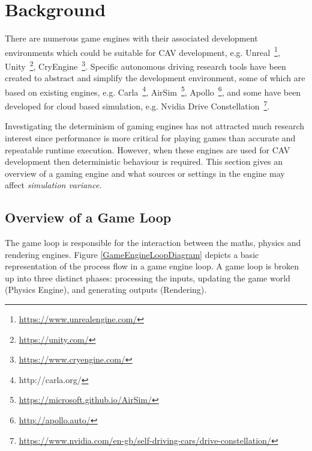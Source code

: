 






\section{Background} \label{s:background}

There are numerous game engines with their associated development environments which could be suitable for CAV development, e.g. Unreal~\footnote{\url{https://www.unrealengine.com/}}, Unity~\footnote{\url{https://unity.com/}}, CryEngine~\footnote{\url{https://www.cryengine.com/}}. Specific autonomous driving research tools have been created to abstract and simplify the development environment, some of which are based on existing engines, e.g. Carla~\footnote{http://carla.org/}, AirSim~\footnote{\url{https://microsoft.github.io/AirSim/}}, Apollo~\footnote{\url{http://apollo.auto/}}, and some have been developed for cloud based simulation, e.g. Nvidia Drive Constellation~\footnote{\url{https://www.nvidia.com/en-gb/self-driving-cars/drive-constellation/}}.

Investigating the determinism of gaming engines has not attracted much research interest since performance is more critical for playing games than accurate and repeatable runtime execution. However, when these engines are used for CAV development then deterministic behaviour is required. This section gives an overview of a gaming engine and what sources or settings in the engine may affect \textit{simulation variance}.
%

\subsection{Overview of a Game Loop} \label{GameLoopSection}
The game loop is responsible for the interaction between the maths, physics and rendering engines. Figure \ref{GameEngineLoopDiagram} depicts a basic representation of the process flow in a game engine loop. A game loop is broken up into three distinct phases: processing the inputs, updating the game world (Physics Engine), and generating outputs (Rendering).~\cite{GameEngineArchBook}

